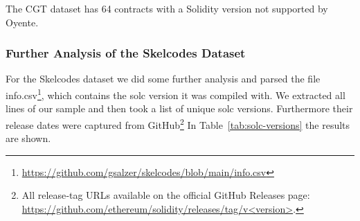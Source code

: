 \documentclass{article}
\newcommand\OY{Oyente}
\begin{document}
	The CGT dataset has 64 contracts with a Solidity version not supported by \OY.

	\subsubsection{Further Analysis of the Skelcodes Dataset}
	For the Skelcodes dataset we did some further analysis and parsed the file info.csv\footnote{\url{https://github.com/gsalzer/skelcodes/blob/main/info.csv}}, which contains the solc version it was compiled with. We extracted all lines of our sample and then took a list of unique solc versions. Furthermore their release dates were captured from GitHub\footnote{All release‐tag URLs available on the official GitHub Releases page: \url{https://github.com/ethereum/solidity/releases/tag/v<version>}.} In Table~\ref{tab:solc-versions} the results are shown.
\end{document}
